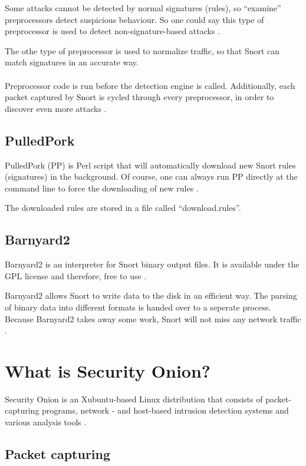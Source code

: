 Some attacks cannot be detected by normal signatures (rules), so ``examine'' preprocessors detect suspicious behaviour. So one could say this type of preprocessor is used to detect non-signature-based attacks \citep{Preprocessor1}. 

The othe type of preprocessor is used to normalize traffic, so that Snort can match signatures in an accurate way.\\ \\
Preprocessor code is run before the detection engine is called. Additionally, each packet captured by Snort is cycled through every preprocessor, in order to discover even more attacks \citep{Preprocessor2}.

\subsection{PulledPork}

PulledPork (PP) is Perl script that will automatically download new Snort rules (signatures) in the background. Of course, one can always run PP directly at the command line to force the downloading of new rules \citep{PP}.

The downloaded rules are stored in a file called ``download.rules''.

\subsection{Barnyard2}

Barnyard2 is an interpreter for Snort binary output files. It is available under the GPL license and therefore, free to use \citep{Barnyard1}.

Barnyard2 allows Snort to write data to the disk in an efficient way. The parsing of binary data into different formats is handed over to a seperate process. Because Barnyard2 takes away some work, Snort will not miss any network traffic \citep{Barnyard2}.

\section{What is Security Onion?}

Security Onion is an Xubuntu-based Linux distribution that consists of packet-capturing programs, network - and host-based intrusion detection systems and various analysis tools \citep{SO1}.

\subsection{Packet capturing}

